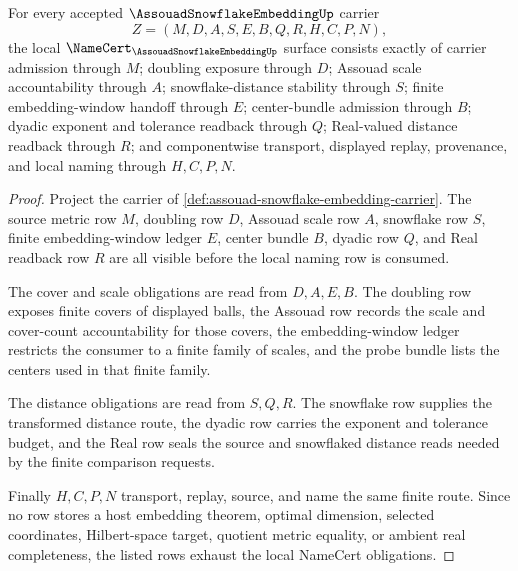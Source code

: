 \begin{theorem}
\label{thm:assouad-snowflake-embedding-namecert-obligations}
For every accepted $\AssouadSnowflakeEmbeddingUp$ carrier
$$
Z=(M,D,A,S,E,B,Q,R,H,C,P,N),
$$
the local $\NameCert_{\AssouadSnowflakeEmbeddingUp}$ surface consists exactly of carrier admission through $M$; doubling exposure through $D$; Assouad scale accountability through $A$; snowflake-distance stability through $S$; finite embedding-window handoff through $E$; center-bundle admission through $B$; dyadic exponent and tolerance readback through $Q$; Real-valued distance readback through $R$; and componentwise transport, displayed replay, provenance, and local naming through $H,C,P,N$.
\end{theorem}
\begin{proof}
Project the carrier of \autoref{def:assouad-snowflake-embedding-carrier}. The source metric row $M$, doubling row $D$, Assouad scale row $A$, snowflake row $S$, finite embedding-window ledger $E$, center bundle $B$, dyadic row $Q$, and Real readback row $R$ are all visible before the local naming row is consumed.

The cover and scale obligations are read from $D,A,E,B$. The doubling row exposes finite covers of displayed balls, the Assouad row records the scale and cover-count accountability for those covers, the embedding-window ledger restricts the consumer to a finite family of scales, and the probe bundle lists the centers used in that finite family.

The distance obligations are read from $S,Q,R$. The snowflake row supplies the transformed distance route, the dyadic row carries the exponent and tolerance budget, and the Real row seals the source and snowflaked distance reads needed by the finite comparison requests.

Finally $H,C,P,N$ transport, replay, source, and name the same finite route. Since no row stores a host embedding theorem, optimal dimension, selected coordinates, Hilbert-space target, quotient metric equality, or ambient real completeness, the listed rows exhaust the local NameCert obligations.
\end{proof}

